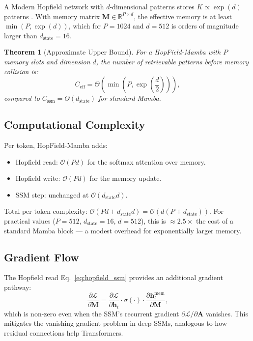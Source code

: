 \documentclass[11pt,a4paper]{article}
\numberwithin{equation}{section}
\newtheorem{theorem}{Theorem}[section]
\newcommand{\R}{\mathbb{R}}
\newcommand{\LL}{\mathcal{L}}
\begin{document}
A Modern Hopfield network with $d$-dimensional patterns stores $K \propto \exp(d)$
patterns \cite{ramsauer2021hopfield}. With memory matrix $\bm{M} \in \R^{P \times d}$,
the effective memory is at least $\min(P, \exp(d))$, which for $P = 1024$ and
$d = 512$ is orders of magnitude larger than $d_{\text{state}} = 16$.

\begin{theorem}[Approximate Upper Bound]
For a HopField-Mamba with $P$ memory slots and dimension $d$, the number of
retrievable patterns before memory collision is:
\begin{equation}
    C_{\text{eff}} = \Theta\left( \min\left(P, \exp\left(\frac{d}{2}\right)\right) \right),
\end{equation}
compared to $C_{\text{ssm}} = \Theta(d_{\text{state}})$ for standard Mamba.
\end{theorem}

\subsection{Computational Complexity}

Per token, HopField-Mamba adds:
\begin{itemize}
    \item Hopfield read: $\mathcal{O}(P d)$ for the softmax attention over memory.
    \item Hopfield write: $\mathcal{O}(P d)$ for the memory update.
    \item SSM step: unchanged at $\mathcal{O}(d_{\text{state}} d)$.
\end{itemize}

Total per-token complexity: $\mathcal{O}(P d + d_{\text{state}} d) = \mathcal{O}(d(P + d_{\text{state}}))$.
For practical values ($P = 512$, $d_{\text{state}} = 16$, $d = 512$), this is
$\approx 2.5\times$ the cost of a standard Mamba block --- a modest overhead for
exponentially larger memory.

\subsection{Gradient Flow}

The Hopfield read Eq.~\ref{eq:hopfield_ssm} provides an additional gradient pathway:
\begin{equation}
    \frac{\partial \LL}{\partial \bm{M}}
    = \frac{\partial \LL}{\partial \bm{h}_t}
    \cdot \sigma(\cdot) \cdot \frac{\partial \bm{h}_t^{\text{mem}}}{\partial \bm{M}},
\end{equation}
which is non-zero even when the SSM's recurrent gradient $\partial \LL / \partial \bm{A}$
vanishes. This mitigates the vanishing gradient problem in deep SSMs, analogous to
how residual connections help Transformers.
\end{document}
